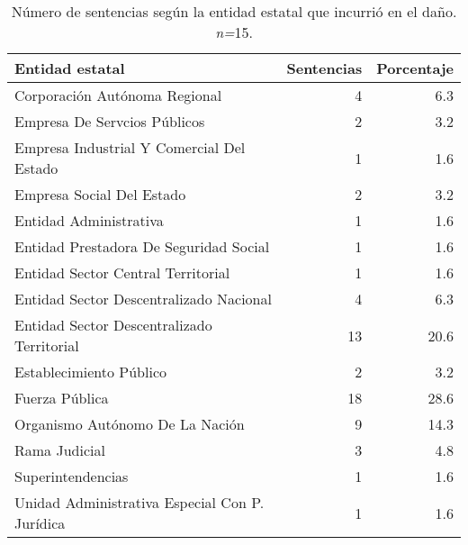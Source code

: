 \begin{table}[!htbp]
\centering
\caption{Número de sentencias según la entidad estatal que incurrió en el daño. \textit{n=}15.} 
\label{tab:entidad}
\begin{tabular}{lrr}
  \hline
Entidad estatal & Sentencias & Porcentaje \\ 
  \hline
Corporación Autónoma Regional &  4 & 6.3 \\ 
  Empresa De Servcios Públicos &  2 & 3.2 \\ 
  Empresa Industrial Y Comercial Del Estado &  1 & 1.6 \\ 
  Empresa Social Del Estado &  2 & 3.2 \\ 
  Entidad Administrativa &  1 & 1.6 \\ 
  Entidad Prestadora De Seguridad Social &  1 & 1.6 \\ 
  Entidad Sector Central Territorial &  1 & 1.6 \\ 
  Entidad Sector Descentralizado Nacional &  4 & 6.3 \\ 
  Entidad Sector Descentralizado Territorial & 13 & 20.6 \\ 
  Establecimiento Público &  2 & 3.2 \\ 
  Fuerza Pública & 18 & 28.6 \\ 
  Organismo Autónomo De La Nación &  9 & 14.3 \\ 
  Rama Judicial &  3 & 4.8 \\ 
  Superintendencias &  1 & 1.6 \\ 
  Unidad Administrativa Especial Con P. Jurídica &  1 & 1.6 \\ 
   \hline
\end{tabular}
\end{table}
